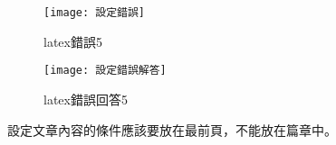 \begin{figure}[ht]
  \begin{minipage}{0.5\textwidth}
    \centering
    \texttt{[image: 設定錯誤]}
    \caption{latex錯誤5}
  \end{minipage}%
  \begin{minipage}{0.5\textwidth}
    \centering
    \texttt{[image: 設定錯誤解答]}
    \caption{latex錯誤回答5}
  \end{minipage}
\end{figure}
設定文章內容的條件應該要放在最前頁，不能放在篇章中。
\newpage
